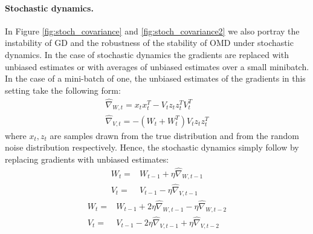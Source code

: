 \paragraph{Stochastic dynamics.} In Figure \ref{fig:stoch_covariance} and \ref{fig:stoch_covariance2} we also portray the instability of GD and the robustness of the stability of OMD under stochastic dynamics. In the case of stochastic dynamics the gradients are replaced with unbiased estimates or with averages of unbiased estimates over a small minibatch. In the case of a mini-batch of one, the unbiased estimates of the gradients in this setting take the following form:
\begin{equation}
\begin{aligned}
\hat{\nabla}_{W, t} = x_{t} x_{t}^T - V_{t}z_{t} z_{t}^T  V_{t}^T\\
\hat{\nabla}_{V, t} = - (W_{t} + W_{t}^T) V_{t} z_t z_t^T
\end{aligned}\tag{Stochastic Gradients}
\end{equation}
where $x_t, z_t$ are samples drawn from the true distribution and from the random noise distribution respectively. Hence, the stochastic dynamics simply follow by replacing gradients with unbiased estimates:
\begin{equation}
\begin{aligned}
W_t =& W_{t-1} + \eta \hat{\nabla}_{W, t-1}\\
V_t =& V_{t-1} - \eta \hat{\nabla}_{V, t-1}
\end{aligned}\tag{SGD for Covariance}
\end{equation}
\begin{equation}
\begin{aligned}
W_t =& W_{t-1} + 2\eta \hat{\nabla}_{W, t-1} - \eta \hat{\nabla}_{W, t-2}\\
V_t =& V_{t-1} - 2\eta \hat{\nabla}_{V, t-1} + \eta \hat{\nabla}_{V, t-2}
\end{aligned}\tag{SOMD for Covariance}
\end{equation}

\newpage

